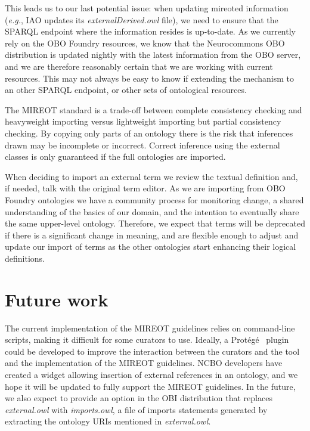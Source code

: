 \documentclass{ao2e}%
\newcommand{\protege}{Prot\'{e}g\'{e}}
\begin{document}
This leads us to our last potential issue: when updating mireoted information (\emph{e.g.}, \ac{IAO} updates its \emph{externalDerived.owl} file), we need to ensure that the SPARQL endpoint where the information resides is up-to-date. As we currently rely on the \ac{OBO} Foundry resources, we know that the Neurocommons \ac{OBO} distribution is updated nightly with the latest information from the \ac{OBO} server, and we are therefore reasonably certain that we are working with current resources. This may not always be easy to know if extending the mechanism to an other SPARQL endpoint, or other sets of ontological resources.

The \ac{MIREOT} standard is a trade-off between complete consistency checking and heavyweight importing versus lightweight importing but partial consistency checking.
By copying only parts of an ontology there is the risk that inferences drawn may be incomplete or incorrect. 
Correct inference using the external classes is only guaranteed if the full ontologies are imported.

When deciding to import an external term we review the textual definition and, if needed, talk with the original term editor.
As we are importing from \ac{OBO} Foundry ontologies we have a community process for monitoring change, a shared understanding of the basics of our domain, and the intention to eventually share the same upper-level ontology. 
Therefore, we expect that terms will be deprecated if there is a significant change in meaning, and are flexible enough to adjust and update our import of terms as the other ontologies start enhancing their logical definitions.



\section*{Future work}

The current implementation of the \ac{MIREOT} guidelines relies on command-line scripts, making it difficult for some curators to use.
Ideally, a \protege\ \cite{RefWorks:1501} plugin could be developed to improve the interaction between the curators and the tool and the implementation of the MIREOT guidelines. NCBO developers have created a widget allowing insertion of external references in an ontology\cite{NCBOWidget}, and we hope it will be updated to fully support the MIREOT guidelines.
In the future, we also expect to provide an option in the OBI distribution that replaces \emph{external.owl} with \emph{imports.owl}, a file of imports statements generated by extracting the ontology URIs mentioned in \emph{external.owl}.%
\end{document}
